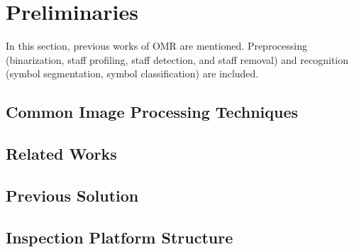 \chapter{Preliminaries}
\label{c:preliminaries}

In this section, previous works of OMR are mentioned. Preprocessing (binarization, staff profiling, staff detection, and staff removal) and recognition (symbol segmentation, symbol classification) are included. 

\section{Common Image Processing Techniques}
\section{Related Works}
\section{Previous Solution}
\section{Inspection Platform Structure}



